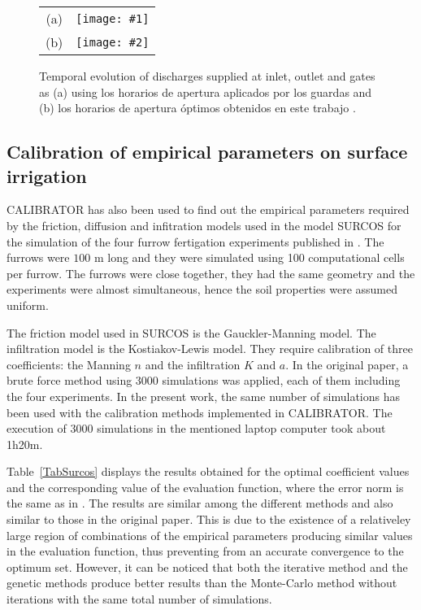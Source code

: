 \documentclass[review,authoryear]{elsarticle}
\newcommand{\FIGII}[4]
{
	\begin{figure}[ht!]
		\centering
		\begin{tabular}{cc}
			(a) & \texttt{[image: \#1]} \\
			(b) & \texttt{[image: \#2]}
		\end{tabular}
		\caption{#3.\label{#4}}
	\end{figure}
}
\begin{document}
\FIGII{Violada-contributions.eps}{Violada-optimized-contributions.eps}
{
	Temporal evolution of discharges supplied at inlet, outlet and gates as (a)
	using los horarios de apertura aplicados por los guardas and (b) los
	horarios de apertura óptimos obtenidos en este trabajo
}{FigSwigs}

\subsection{Calibration of empirical parameters on surface irrigation}

CALIBRATOR has also been used to find out the empirical parameters required by the friction, diffusion and infitration
models used in the model SURCOS \citep{Surcos,SurcosGit,JaviSurcos3} for the simulation of the four furrow fertigation experiments published in \citet{JaviSurcos2}. The furrows were $100$ m long and they were simulated using 100 computational cells per furrow. The furrows were close together, they had the same geometry and the experiments were almost simultaneous, hence the soil properties were assumed uniform. 

The friction model used in SURCOS is the Gauckler-Manning model. The infiltration model is the Kostiakov-Lewis model. They require calibration of three coefficients: the Manning $n$ and the infiltration $K$ and $a$. In the original paper, a brute force method using 3000 simulations was applied, each of them including the four experiments. In the present work, the same number of simulations has been used with the calibration methods implemented in CALIBRATOR. The execution of 3000 simulations in the mentioned laptop computer took about 1h20m.  

Table~\ref{TabSurcos} displays the results obtained for the optimal coefficient values and the corresponding
value of the evaluation function, where the error norm is the same as in \citet{JaviSurcos2}. The results are similar among the different methods and also similar to those in the original paper. This is due to the existence of a relativeley large region of combinations of the empirical parameters producing similar values in the evaluation function, thus preventing from an accurate convergence to the optimum set. However, it can be noticed that both the iterative method and the genetic methods produce better results than the Monte-Carlo method without iterations with the same total number of simulations.
\end{document}

